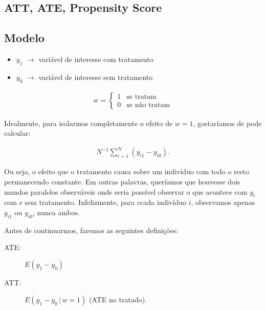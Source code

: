 \documentclass[11pt,oneside,a4paper]{article}
\numberwithin{equation}{section}
\begin{document}
\begin{description}
\begin{description}
\clearpage
\section{ATT, ATE, Propensity Score}


\subsection*{Modelo}

\begin{itemize}\itemsep0pt
\item
$y_{1}$ $\rightarrow$ variável de interesse com tratamento

\item
$y_{0}$ $\rightarrow$ variável de interesse sem tratamento
\end{itemize}

\vspace{-1 em}
\begin{align*}
w = 
\begin{cases}
1 & \text{se tratam}
\\
0 & \text{se não tratam}
\end{cases}
\end{align*}
 
Idealmente, para isolarmos completamente o efeito de $w=1$, gostaríamos de pode calcular:

\vspace{-1 em}
\begin{align*}
	N^{-1} \sum_{i=1}^{N}
	\left( y_{i1} - y_{i0} \right).
\end{align*}

Ou seja, o efeito que o tratamento causa sobre um indivíduo com todo o resto permanecendo constante.
Em outras palavras, queríamos que houvesse dois mundos paralelos observáveis onde seria possível observar o que acontece com $y_{i}$ com e sem tratamento.
Infelizmente, para ccada indivíduo $i$, observamos apenas $y_{i1}$ ou $y_{i0}$, nunca ambos.

Antes de continuarmos, faremos as seguintes definições:

\begin{description}
	\item[ATE:]  $E( y_{1} - y_{0} )$
	\item[ATT:]  $E( y_{1} - y_{0} \, | \, w = 1 )$ (ATE no tratado).
\end{description}


\end{description}
\end{description}
\end{document}
